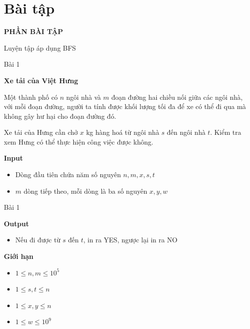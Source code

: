 \section{Bài tập}

\begin{frame}
\centering
\vspace{2cm}

{\Huge \textbf{\color{mainblue}PHẦN BÀI TẬP}}

\vspace{0.5cm}
{\large Luyện tập áp dụng BFS}

\end{frame}
\begin{frame}{Bài 1}
\begin{center}
\textbf{Xe tải của Việt Hưng}
\end{center}
{\small
Một thành phố có $n$ ngôi nhà và $m$ đoạn đường hai chiều nối giữa các ngôi nhà, với mỗi đoạn đường, người ta tính được khối lượng tối đa để xe có thể đi qua mà không gây hư hại cho đoạn đường đó.

Xe tải của Hưng cần chở $x$ kg hàng hoá từ ngôi nhà $s$ đến ngôi nhà $t$. Kiểm tra xem Hưng có thể thực hiện công việc được không.
}

\vspace{0.4cm}

\textbf{Input}
\begin{itemize}
\item Dòng đầu tiên chứa năm số nguyên $n, m, x, s, t$
\item $m$ dòng tiếp theo, mỗi dòng là ba số nguyên $x, y, w$
\end{itemize}

\end{frame}
\begin{frame}{Bài 1}

\textbf{Output}
\begin{itemize}
\item Nếu đi được từ $s$ đến $t$, in ra YES, ngược lại in ra NO
\end{itemize}

\vspace{0.3cm}

\textbf{Giới hạn}
\begin{itemize}
\item $1 \le n, m \le 10^5$
\item $1 \le s, t \le n$
\item $1 \le x, y \le n$
\item $1 \le w \le 10^9$
\end{itemize}

\end{frame}
